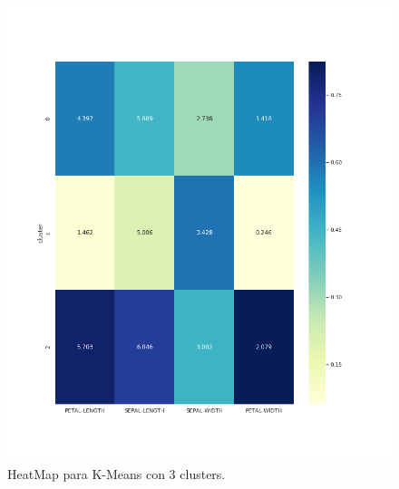 \documentclass[a4paper, 20pt]{article}
\begin{document}
\begin{figure}[h]
\centering
\includegraphics[scale=0.55]{dani/heatmapK-MeansIRIS.png}
\caption{HeatMap para K-Means con 3 clusters.}
\label{hmkm}
\end{figure}

\clearpage
\end{document}
